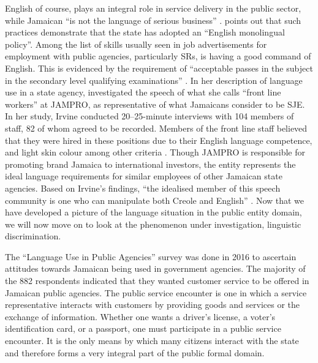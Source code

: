 \documentclass[output=paper,colorlinks,citecolor=brown]{langscibook}
\begin{document}
English of course, plays an integral role in service delivery in the public sector, while Jamaican “is not the language of serious business” \citep[218]{Irvine2005}. \citet[4]{Brown-Blake2011} points out that such practices demonstrate that the state has adopted an “English monolingual policy”. Among the list of skills usually seen in job advertisements for employment with public agencies, particularly SRs, is having a good command of English. This is evidenced by the requirement of “acceptable passes in the subject in the secondary level qualifying examinations” \citep[32]{Brown-Blake2011}. In her description of language use in a state agency, \citet{Irvine2005} investigated the speech of what she calls “front line workers” at JAMPRO, as representative of what Jamaicans consider to be SJE. In her study, Irvine conducted 20–25-minute interviews with 104 members of staff, 82 of whom agreed to be recorded. Members of the front line staff believed that they were hired in these positions due to their English language competence, and light skin colour among other criteria \citep[271]{Irvine2005}. Though JAMPRO is responsible for promoting brand Jamaica to international investors, the entity represents the ideal language requirements for similar employees of other Jamaican state agencies. Based on Irvine’s findings, “the idealised member of this speech community is one who can manipulate both Creole and English” \citep[271]{Irvine2005}. Now that we have developed a picture of the language situation in the public entity domain, we will now move on to look at the phenomenon under investigation, linguistic discrimination.

The “Language Use in Public Agencies” survey was done in 2016 to ascertain attitudes towards Jamaican being used in government agencies. The majority of the 882 respondents indicated that they wanted customer service to be offered in Jamaican public agencies. The public service encounter is one in which a service representative interacts with customers by providing goods and services or the exchange of information. Whether one wants a driver’s license, a voter’s identification card, or a passport, one must participate in a public service encounter. It is the only means by which many citizens interact with the state and therefore forms a very integral part of the public formal domain. 
\end{document}
